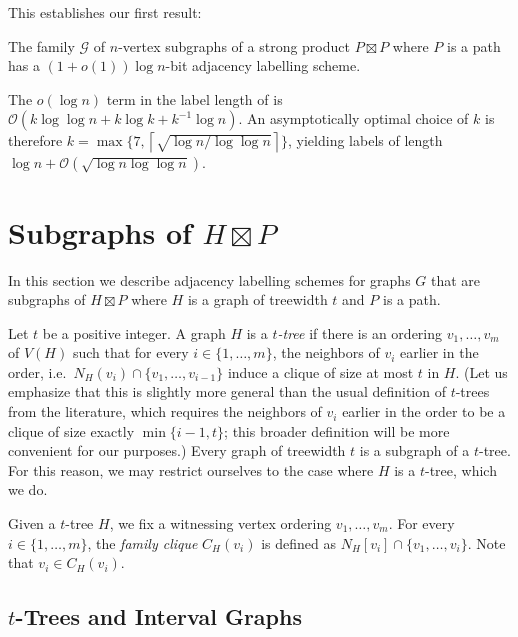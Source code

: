\documentclass[kpfonts]{patmorin}
\newcommand{\Oh}{\mathcal{O}}
\begin{document}
This establishes our first result:

\begin{thm}
  The family $\mathcal{G}$ of $n$-vertex subgraphs of a strong product $P\boxtimes P$ where $P$ is a path has a $(1+o(1))\log n$-bit adjacency labelling scheme.
\end{thm}

\begin{rem}
  The $o(\log n)$ term in the label length of  is $\Oh(k\log\log n + k \log k + k^{-1}\log n)$.  An asymptotically optimal choice of $k$ is therefore $k=\max\{7,\left\lceil\sqrt{\log n / \log\log n}\right\rceil\}$, yielding labels of length $\log n + \Oh\left(\sqrt{\log n\log\log n}\right)$.
\end{rem}


\section{Subgraphs of $H\boxtimes P$}

In this section we describe adjacency labelling schemes for graphs $G$ that are subgraphs of $H\boxtimes P$ where $H$ is a graph of treewidth $t$ and $P$ is a path.


Let $t$ be a positive integer.
A graph $H$ is a \emph{$t$-tree} if there is an ordering $v_1,\ldots,v_m$ of $V(H)$ such that 
for every $i\in\{1,\ldots,m\}$, the neighbors of $v_i$ earlier in the order, i.e.\ $N_H(v_i) \cap \{v_1,\ldots,v_{i-1}\}$ induce a clique of size at most $t$ in $H$. 
(Let us emphasize that this is slightly more general than the usual definition of $t$-trees from the literature, which requires the neighbors of $v_i$ earlier in the order to be a clique of size exactly $\min\{i-1, t\}$; this broader definition will be more convenient for our purposes.) 
Every graph of treewidth $t$ is a subgraph of a $t$-tree. 
For this reason, we may restrict ourselves to the case where $H$ is a $t$-tree, which we do.


Given a $t$-tree $H$, we fix a witnessing vertex ordering $v_1,\ldots,v_m$.
For every $i\in\{1,\ldots,m\}$, the \emph{family clique} $C_H(v_i)$ is defined as
$N_H[v_i]\cap \{v_1,\ldots,v_{i}\}$. 
Note that $v_i \in C_H(v_i)$.

\subsection{$t$-Trees and Interval Graphs}
\end{document}
